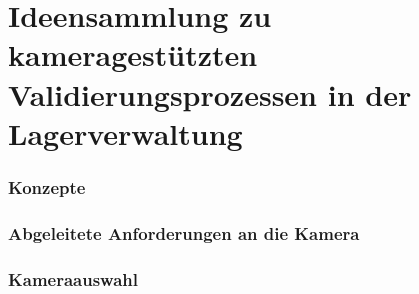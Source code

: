 \chapter{Ideensammlung zu kameragestützten Validierungsprozessen in der Lagerverwaltung}

    \subsection {Konzepte}

    \subsection {Abgeleitete Anforderungen an die Kamera}

    \subsection {Kameraauswahl}